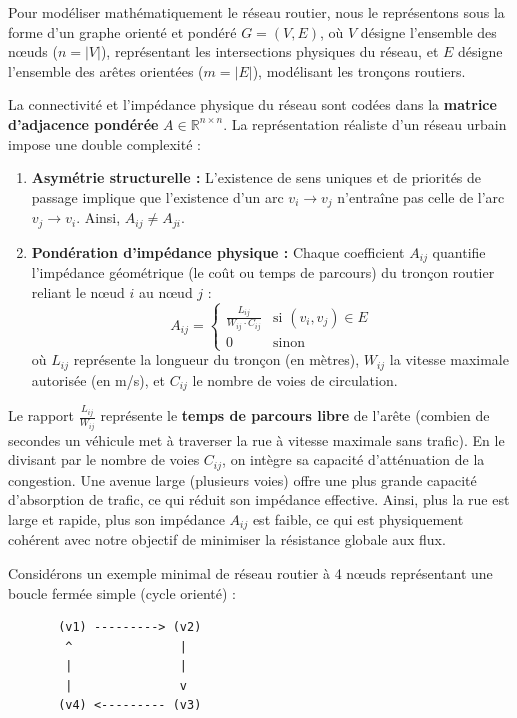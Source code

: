 \documentclass[10pt, a4paper]{article}
\providecommand{\tightlist}{}
\begin{document}
Pour modéliser mathématiquement le réseau routier, nous le représentons
sous la forme d'un graphe orienté et pondéré \(G = (V, E)\), où \(V\)
désigne l'ensemble des nœuds (\(n = |V|\)), représentant les
intersections physiques du réseau, et \(E\) désigne l'ensemble des
arêtes orientées (\(m = |E|\)), modélisant les tronçons routiers.

La connectivité et l'impédance physique du réseau sont codées dans la
\textbf{matrice d'adjacence pondérée} \(A \in \mathbb{R}^{n \times n}\).
La représentation réaliste d'un réseau urbain impose une double
complexité :

\begin{enumerate}
\def\labelenumi{\arabic{enumi}.}
\tightlist
\item
  \textbf{Asymétrie structurelle :} L'existence de sens uniques et de
  priorités de passage implique que l'existence d'un arc \(v_i \to v_j\)
  n'entraîne pas celle de l'arc \(v_j \to v_i\). Ainsi,
  \(A_{ij} \neq A_{ji}\).
\item
  \textbf{Pondération d'impédance physique :} Chaque coefficient
  \(A_{ij}\) quantifie l'impédance géométrique (le coût ou temps de
  parcours) du tronçon routier reliant le nœud \(i\) au nœud \(j\) :
  \[A_{ij} = \begin{cases} \frac{L_{ij}}{W_{ij} \cdot C_{ij}} & \text{si } (v_i, v_j) \in E \\ 0 & \text{sinon} \end{cases}\]
  où \(L_{ij}\) représente la longueur du tronçon (en mètres),
  \(W_{ij}\) la vitesse maximale autorisée (en m/s), et \(C_{ij}\) le
  nombre de voies de circulation.
\end{enumerate}

Le rapport \(\frac{L_{ij}}{W_{ij}}\) représente le \textbf{temps de
parcours libre} de l'arête (combien de secondes un véhicule met à
traverser la rue à vitesse maximale sans trafic). En le divisant par le
nombre de voies \(C_{ij}\), on intègre sa capacité d'atténuation de la
congestion. Une avenue large (plusieurs voies) offre une plus grande
capacité d'absorption de trafic, ce qui réduit son impédance effective.
Ainsi, plus la rue est large et rapide, plus son impédance \(A_{ij}\)
est faible, ce qui est physiquement cohérent avec notre objectif de
minimiser la résistance globale aux flux.

Considérons un exemple minimal de réseau routier à 4 nœuds représentant
une boucle fermée simple (cycle orienté) :

\begin{verbatim}
       (v1) ---------> (v2)
        ^               |
        |               |
        |               v
       (v4) <--------- (v3)
\end{verbatim}
\end{document}
